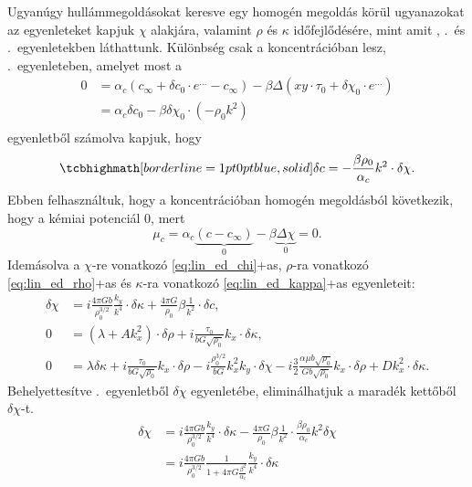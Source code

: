 \documentclass[10pt,a4paper]{scrartcl}
\begin{document}
Ugyanúgy hullámmegoldásokat keresve egy homogén megoldás körül ugyanazokat az egyenleteket kapjuk $\chi$ alakjára, valamint $\rho$ és $\kappa$ időfejlődésére, mint amit , .\ és .\ egyenletekben láthattunk. Különbség csak a koncentrációban lesz, .\ egyenleteben, amelyet most a
\[\begin{aligned}
0 & = {\alpha _c}\left( {{c_{\infty} } + \delta {c_0} \cdot {e^{\ldots} } - {c_{\infty}}} \right) - \beta \Delta \left( {xy \cdot {\tau _0} + \delta {\chi _0} \cdot {e^{\ldots} }} \right)\\
   &  = {\alpha _c}\delta {c_0} - \beta \delta {\chi _0} \cdot \left( { - {\rho _0}{k^2}} \right) \\ 
\end{aligned}\]
egyenletből számolva kapjuk, hogy
\begin{equation} \label{eq:fd_c_elim}
\tcbhighmath[borderline={1pt}{0pt}{blue,solid}]{\delta {c} =  - \frac{{\beta {\rho _0}}}{{{\alpha _c}}}{k^2} \cdot \delta {\chi}.}
\end{equation}
Ebben felhasználtuk, hogy a koncentrációban homogén megoldásból következik, hogy a kémiai potenciál 0, mert
\[{\mu _c} = {\alpha _c}\underbrace {\left( {c - {c_\infty }} \right)}_0 - \beta \underbrace {\Delta \chi }_0 = 0.\]
Idemásolva a $\chi$-re vonatkozó \told\ref{eq:lin_ed_chi}+as{}, $\rho$-ra vonatkozó \told\ref{eq:lin_ed_rho}+as{} és $\kappa$-ra vonatkozó \told\ref{eq:lin_ed_kappa}+as{} egyenleteit:
\begin{align*}
\delta \chi & = i\frac{{4\pi Gb}}{{\rho _0^{3/2}}}\frac{{{k_y}}}{{{k^4}}} \cdot \delta \kappa  + \frac{{4\pi G}}{{{\rho _0}}}\beta \frac{1}{{{k^2}}} \cdot \delta c,\\
0 & = \left( {\lambda  + Ak_x^2} \right) \cdot \delta \rho  + i\frac{{{\tau _0}}}{{bG\sqrt {{\rho _0}} }}{k_x} \cdot \delta \kappa,\\
0 & = \lambda \delta\kappa  + i\frac{{{\tau _0}}}{{bG\sqrt {{\rho _0}} }}{k_x} \cdot \delta \rho  - i\frac{{\rho _0^{3/2}}}{{bG}}k_x^2{k_y} \cdot \delta \chi  - i\frac{3}{2}\frac{{\alpha \mu b\sqrt {{\rho _0}} }}{{Gb\sqrt {{\rho _0}} }}{k_x} \cdot \delta \rho  + Dk_x^2 \cdot \delta \kappa.
\end{align*}
Behelyettesítve .\ egyenletből $\delta\chi$ egyenletébe, eliminálhatjuk a maradék kettőből $\delta\chi$-t.
\[\begin{aligned}
  \delta \chi  &  = i\frac{{4\pi Gb}}{{\rho _0^{3/2}}}\frac{{{k_y}}}{{{k^4}}} \cdot \delta \kappa  - \frac{{4\pi G}}{{{\rho _0}}}\beta \frac{1}{{{k^2}}} \cdot \frac{{\beta {\rho _0}}}{{{\alpha _c}}}{k^2}\delta \chi  \\ 
   &  = i\frac{{4\pi Gb}}{{\rho _0^{3/2}}}\frac{1}{{1 + 4\pi G\frac{{{\beta ^2}}}{{{\alpha _c}}}}}\frac{{{k_y}}}{{{k^4}}} \cdot \delta \kappa  \\ 
\end{aligned} \]
\end{document}
